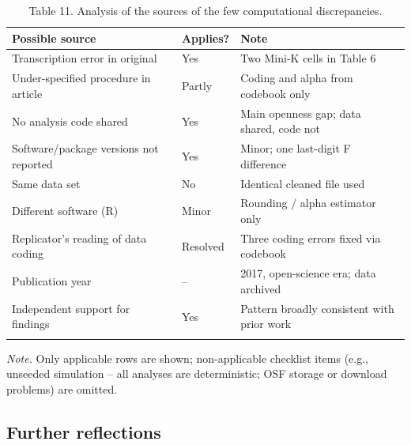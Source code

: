 \documentclass[
  english,
  man,floatsintext]{apa6}
\begin{document}
\begin{table}[tbp]

\begin{center}
\begin{threeparttable}

\caption{\label{tab:tab-causes}Table 11. Analysis of the sources of the few computational discrepancies.}

\small{

\begin{tabular}{lll}
\toprule
Possible source & Applies? & Note\\
\midrule
Transcription error in original & Yes & Two Mini-K cells in Table 6\\
Under-specified procedure in article & Partly & Coding and alpha from codebook only\\
No analysis code shared & Yes & Main openness gap; data shared, code not\\
Software/package versions not reported & Yes & Minor; one last-digit F difference\\
Same data set & No & Identical cleaned file used\\
Different software (R) & Minor & Rounding / alpha estimator only\\
Replicator's reading of data coding & Resolved & Three coding errors fixed via codebook\\
Publication year & -- & 2017, open-science era; data archived\\
Independent support for findings & Yes & Pattern broadly consistent with prior work\\
\bottomrule
\addlinespace
\end{tabular}

}

\begin{tablenotes}[para]
\normalsize{\textit{Note.} Only applicable rows are shown; non-applicable checklist items (e.g., unseeded simulation -- all analyses are deterministic; OSF storage or download problems) are omitted.}
\end{tablenotes}

\end{threeparttable}
\end{center}

\end{table}

\subsection{Further reflections}\label{further-reflections}
\end{document}
